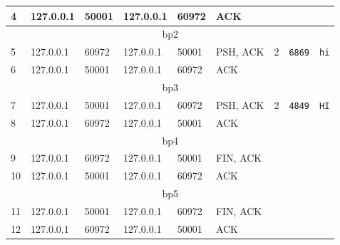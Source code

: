 \documentclass{scrartcl}
\begin{document}
\begin{figure}[H]
\begin{tabular}{|lllllllll|}
\multicolumn{1}{|l|}{4} & \multicolumn{1}{l|}{127.0.0.1} & \multicolumn{1}{l|}{50001} & \multicolumn{1}{l|}{127.0.0.1} & \multicolumn{1}{l|}{60972} & \multicolumn{1}{l|}{ACK} & \multicolumn{1}{l|}{} & \multicolumn{1}{l|}{} &  \\ \hline
\multicolumn{9}{|c|}{bp2} \\ \hline
\multicolumn{1}{|l|}{5} & \multicolumn{1}{l|}{127.0.0.1} & \multicolumn{1}{l|}{60972} & \multicolumn{1}{l|}{127.0.0.1} & \multicolumn{1}{l|}{50001} & \multicolumn{1}{l|}{PSH, ACK} & \multicolumn{1}{l|}{2} & \multicolumn{1}{l|}{\texttt{6869}} & \texttt{hi} \\ \hline
\multicolumn{1}{|l|}{6} & \multicolumn{1}{l|}{127.0.0.1} & \multicolumn{1}{l|}{50001} & \multicolumn{1}{l|}{127.0.0.1} & \multicolumn{1}{l|}{60972} & \multicolumn{1}{l|}{ACK} & \multicolumn{1}{l|}{} & \multicolumn{1}{l|}{} &  \\ \hline
\multicolumn{9}{|c|}{bp3} \\ \hline
\multicolumn{1}{|l|}{7} & \multicolumn{1}{l|}{127.0.0.1} & \multicolumn{1}{l|}{50001} & \multicolumn{1}{l|}{127.0.0.1} & \multicolumn{1}{l|}{60972} & \multicolumn{1}{l|}{PSH, ACK} & \multicolumn{1}{l|}{2} & \multicolumn{1}{l|}{\texttt{4849}} & \texttt{HI} \\ \hline
\multicolumn{1}{|l|}{8} & \multicolumn{1}{l|}{127.0.0.1} & \multicolumn{1}{l|}{60972} & \multicolumn{1}{l|}{127.0.0.1} & \multicolumn{1}{l|}{50001} & \multicolumn{1}{l|}{ACK} & \multicolumn{1}{l|}{} & \multicolumn{1}{l|}{} &  \\ \hline
\multicolumn{9}{|c|}{bp4} \\ \hline
\multicolumn{1}{|l|}{9} & \multicolumn{1}{l|}{127.0.0.1} & \multicolumn{1}{l|}{60972} & \multicolumn{1}{l|}{127.0.0.1} & \multicolumn{1}{l|}{50001} & \multicolumn{1}{l|}{FIN, ACK} & \multicolumn{1}{l|}{} & \multicolumn{1}{l|}{} &  \\ \hline
\multicolumn{1}{|l|}{10} & \multicolumn{1}{l|}{127.0.0.1} & \multicolumn{1}{l|}{50001} & \multicolumn{1}{l|}{127.0.0.1} & \multicolumn{1}{l|}{60972} & \multicolumn{1}{l|}{ACK} & \multicolumn{1}{l|}{} & \multicolumn{1}{l|}{} &  \\ \hline
\multicolumn{9}{|c|}{bp5} \\ \hline
\multicolumn{1}{|l|}{11} & \multicolumn{1}{l|}{127.0.0.1} & \multicolumn{1}{l|}{50001} & \multicolumn{1}{l|}{127.0.0.1} & \multicolumn{1}{l|}{60972} & \multicolumn{1}{l|}{FIN, ACK} & \multicolumn{1}{l|}{} & \multicolumn{1}{l|}{} &  \\ \hline
\multicolumn{1}{|l|}{12} & \multicolumn{1}{l|}{127.0.0.1} & \multicolumn{1}{l|}{60972} & \multicolumn{1}{l|}{127.0.0.1} & \multicolumn{1}{l|}{50001} & \multicolumn{1}{l|}{ACK} & \multicolumn{1}{l|}{} & \multicolumn{1}{l|}{} &  \\ \hline
\end{tabular}
\end{figure}
\end{document}
